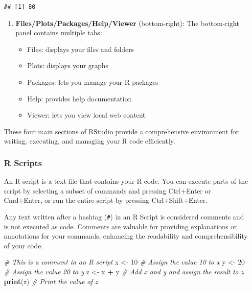 \documentclass[
]{book}
\newenvironment{Shaded}{\begin{snugshade}}{\end{snugshade}}
\newcommand{\CommentTok}[1]{\textcolor[rgb]{0.56,0.35,0.01}{\textit{#1}}}
\newcommand{\DecValTok}[1]{\textcolor[rgb]{0.00,0.00,0.81}{#1}}
\newcommand{\FunctionTok}[1]{\textcolor[rgb]{0.13,0.29,0.53}{\textbf{#1}}}
\newcommand{\NormalTok}[1]{#1}
\newcommand{\OtherTok}[1]{\textcolor[rgb]{0.56,0.35,0.01}{#1}}
\newcommand{\SpecialCharTok}[1]{\textcolor[rgb]{0.81,0.36,0.00}{\textbf{#1}}}
\providecommand{\tightlist}{%
  \setlength{\itemsep}{0pt}\setlength{\parskip}{0pt}}
\begin{document}
\begin{verbatim}
## [1] 80
\end{verbatim}

\begin{enumerate}
\def\labelenumi{\arabic{enumi}.}
\setcounter{enumi}{3}
\tightlist
\item
  \textbf{Files/Plots/Packages/Help/Viewer} (bottom-right): The bottom-right panel contains multiple tabs:

  \begin{itemize}
  \tightlist
  \item
    Files: displays your files and folders
  \item
    Plots: displays your graphs
  \item
    Packages: lets you manage your R packages
  \item
    Help: provides help documentation
  \item
    Viewer: lets you view local web content
  \end{itemize}
\end{enumerate}

These four main sections of RStudio provide a comprehensive environment for writing, executing, and managing your R code efficiently.

\hypertarget{r-scripts}{%
\subsubsection*{R Scripts}\label{r-scripts}}

An R script is a text file that contains your R code. You can execute parts of the script by selecting a subset of commands and pressing Ctrl+Enter or Cmd+Enter, or run the entire script by pressing Ctrl+Shift+Enter.

Any text written after a hashtag (\texttt{\#}) in an R Script is considered comments and is not executed as code. Comments are valuable for providing explanations or annotations for your commands, enhancing the readability and comprehensibility of your code.

\begin{Shaded}
\begin{Highlighting}[]
\CommentTok{\# This is a comment in an R script}
\NormalTok{x }\OtherTok{\textless{}{-}} \DecValTok{10}  \CommentTok{\# Assign the value 10 to x}
\NormalTok{y }\OtherTok{\textless{}{-}} \DecValTok{20}  \CommentTok{\# Assign the value 20 to y}
\NormalTok{z }\OtherTok{\textless{}{-}}\NormalTok{ x }\SpecialCharTok{+}\NormalTok{ y  }\CommentTok{\# Add x and y and assign the result to z}
\FunctionTok{print}\NormalTok{(z)  }\CommentTok{\# Print the value of z}
\end{Highlighting}
\end{Shaded}
\end{document}
